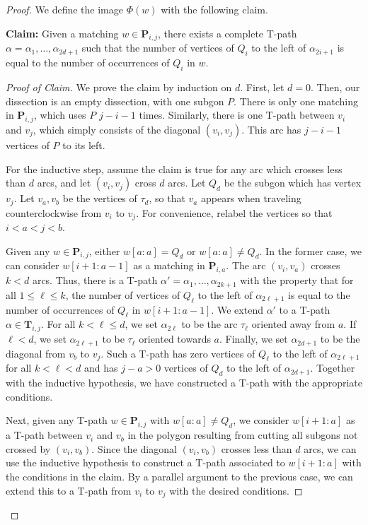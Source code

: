 \documentclass[12pt]{article}
\theoremstyle{remark}
\newcommand*{\pathset}[2]{\mathbf{P}_{#1,#2}}
\begin{document}
\begin{proof}
We define the image $\Phi(w)$ with the following claim.

\textbf{Claim:} Given a matching $w \in \pathset{i}{j}$, there exists a complete T-path $\alpha = \alpha_1,\ldots,\alpha_{2d+1}$ such that the number of vertices of $Q_i$ to the left of $\alpha_{2i+1}$ is equal to the number of occurrences of $Q_i$ in $w$.

\begin{proof}[Proof of Claim]
We prove the claim by induction on $d$. First, let $d = 0$. Then, our dissection is an empty dissection, with one subgon $P$. There is only one matching in $\pathset{i}{j}$, which uses $P$ $j-i-1$ times. Similarly, there is one T-path between $v_i$ and $v_j$, which simply consists of the diagonal $(v_i,v_j)$. This arc has $j-i-1$ vertices of $P$ to its left. 

For the inductive step, assume the claim is true for any arc which crosses less than $d$ arcs, and let $(v_i,v_j)$ cross $d$ arcs. Let $Q_d$ be the subgon which has vertex $v_j$. Let $v_a,v_b$ be the vertices of $\tau_d$, so that $v_a$ appears when traveling counterclockwise from $v_i$ to $v_j$. For convenience, relabel the vertices so that $i < a < j < b$.

Given any $w \in \pathset{i}{j}$, either $w[a:a] = Q_d$ or $w[a:a] \neq Q_d$. In the former case, we can consider $w[i+1:a-1]$ as a matching in $\pathset{i}{a}$. The arc $(v_i,v_a)$ crosses $k < d$ arcs. Thus, there is a T-path $\alpha' = \alpha_1,\ldots,\alpha_{2k+1}$ with the property that for all $1 \leq \ell \leq k$, the number of vertices of $Q_\ell$ to the left of $\alpha_{2\ell + 1}$ is equal to the number of occurrences of $Q_\ell$ in $w[i+1:a-1]$. We extend $\alpha'$ to a T-path $\alpha \in \textbf{T}_{i,j}$. For all $k < \ell \leq d$, we set $\alpha_{2\ell}$ to be the arc $\tau_\ell$ oriented away from $a$. If $\ell < d$, we set $\alpha_{2\ell + 1}$ to be $\tau_{\ell}$ oriented towards $a$. Finally, we set $\alpha_{2d + 1}$ to be the diagonal from $v_b$ to $v_j$. Such a T-path has zero vertices of $Q_{\ell}$ to the left of $\alpha_{2\ell + 1}$ for all $k < \ell < d$ and has $j - a > 0$ vertices of $Q_d$ to the left of $\alpha_{2d + 1}$. Together with the inductive hypothesis, we have constructed a T-path with the appropriate conditions.

Next, given any T-path $w \in \pathset{i}{j}$ with $w[a:a] \neq Q_d$, we consider $w[i+1:a]$ as a T-path between $v_i$ and $v_b$ in the polygon resulting from cutting all subgons not crossed by $(v_i,v_b)$. Since the diagonal $(v_i,v_b)$ crosses less than $d$ arcs, we can use the inductive hypothesis to construct a T-path associated to $w[i+1:a]$ with the conditions in the claim. By a parallel argument to the previous case, we can extend this to a T-path from $v_i$ to $v_j$ with the desired conditions.
\end{proof}


\end{proof}
\end{document}
